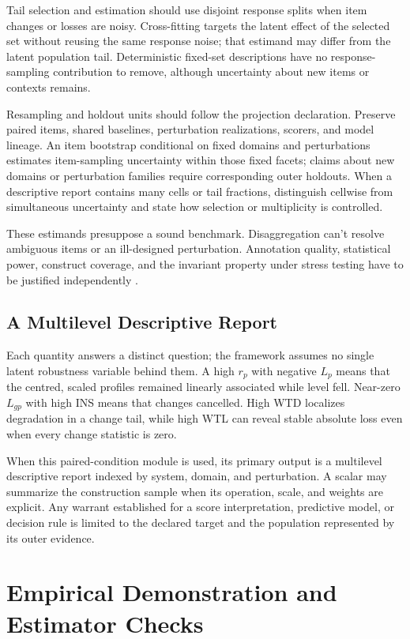 \documentclass[12pt]{article}
\begin{document}
Tail selection and estimation should use disjoint response splits when item changes or losses are noisy. Cross-fitting targets the latent effect of the selected set without reusing the same response noise; that estimand may differ from the latent population tail. Deterministic fixed-set descriptions have no response-sampling contribution to remove, although uncertainty about new items or contexts remains.

Resampling and holdout units should follow the projection declaration. Preserve paired items, shared baselines, perturbation realizations, scorers, and model lineage. An item bootstrap conditional on fixed domains and perturbations estimates item-sampling uncertainty within those fixed facets; claims about new domains or perturbation families require corresponding outer holdouts. When a descriptive report contains many cells or tail fractions, distinguish cellwise from simultaneous uncertainty and state how selection or multiplicity is controlled.

These estimands presuppose a sound benchmark. Disaggregation can't resolve ambiguous items or an ill-designed perturbation. Annotation quality, statistical power, construct coverage, and the invariant property under stress testing have to be justified independently \citep{bowmanDahl2021benchmarking}.

\subsection{A Multilevel Descriptive Report}\label{ssec:no_scalar}

Each quantity answers a distinct question; the framework assumes no single latent robustness variable behind them. A high \(r_p\) with negative \(L_p\) means that the centred, scaled profiles remained linearly associated while level fell. Near-zero \(L_{gp}\) with high INS means that changes cancelled. High WTD localizes degradation in a change tail, while high WTL can reveal stable absolute loss even when every change statistic is zero.

When this paired-condition module is used, its primary output is a multilevel descriptive report indexed by system, domain, and perturbation. A scalar may summarize the construction sample when its operation, scale, and weights are explicit. Any warrant established for a score interpretation, predictive model, or decision rule is limited to the declared target and the population represented by its outer evidence.

\section{Empirical Demonstration and Estimator Checks}\label{sec:demonstration}
\end{document}

